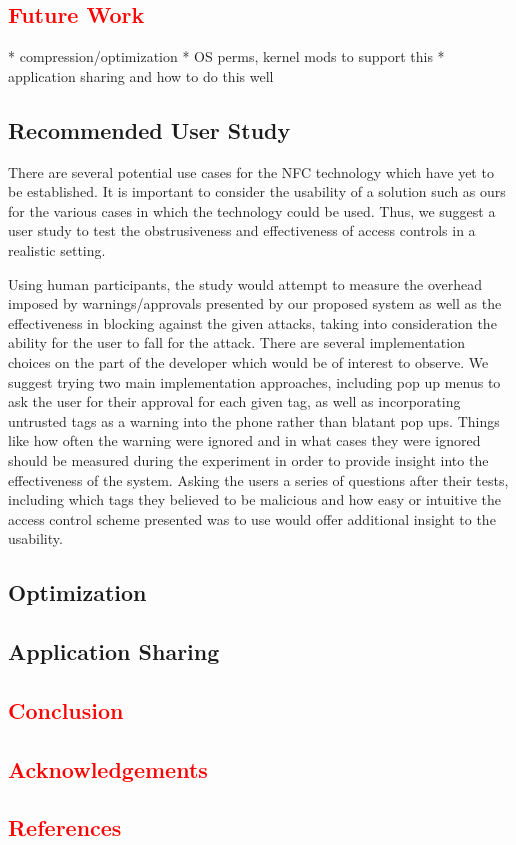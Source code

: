 \documentclass[12pt]{article}
\newcommand\TODO[1]{\textcolor{red}{#1}}
\begin{document}
\TODO{\section{Future Work}}
* compression/optimization
* OS perms, kernel mods to support this
* application sharing and how to do this well

\subsection{Recommended User Study}
There are several potential use cases for the NFC technology which have yet to be established. It is important to consider the usability of a solution such as ours for the various cases in which the technology could be used. Thus, we suggest a user study to test the obstrusiveness and effectiveness of access controls in a realistic setting. 

Using human participants, the study would attempt to measure the overhead imposed by warnings/approvals presented by our proposed system as well as the effectiveness in blocking against the given attacks, taking into consideration the ability for the user to fall for the attack. There are several implementation choices on the part of the developer which would be of interest to observe. We suggest trying two main implementation approaches, including pop up menus to ask the user for their approval for each given tag, as well as incorporating untrusted tags as a warning into the phone rather than blatant pop ups. Things like how often the warning were ignored and in what cases they were ignored should be measured during the experiment in order to provide insight into the effectiveness of the system. Asking the users a series of questions after their tests, including which tags they believed to be malicious and how easy or intuitive the access control scheme presented was to use would offer additional insight to the usability. 

\subsection{Optimization}

\subsection{Application Sharing}

\TODO{\section{Conclusion}}

\TODO{\section{Acknowledgements}}

\TODO{\section{References}}



\end{document}
